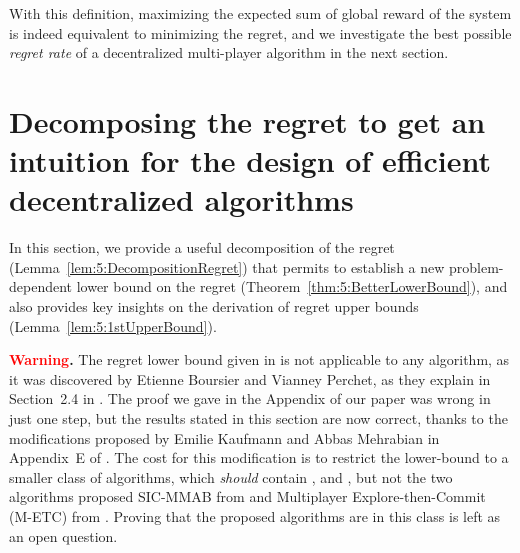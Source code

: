With this definition, maximizing the expected sum of global reward of the system is indeed equivalent to minimizing the regret, and we investigate the best possible \emph{regret rate} of a decentralized multi-player algorithm in the next section.



\section[Decomposing the regret to get an intuition about efficient decentralized algorithms]{Decomposing the regret to get an intuition for the design of efficient decentralized algorithms}
\label{sec:5:lowerbound}

In this section, we provide a useful decomposition of the regret (Lemma~\ref{lem:5:DecompositionRegret}) that permits to establish a new problem-dependent lower bound on the regret (Theorem~\ref{thm:5:BetterLowerBound}), and also provides key insights on the derivation of regret upper bounds (Lemma~\ref{lem:5:1stUpperBound}).

  \textbf{\textcolor{red}{Warning}.}
  The regret lower bound given in \cite{Besson2018ALT} is not applicable to any algorithm,
  as it was discovered by Etienne Boursier and Vianney Perchet, as they explain in Section~2.4 in \cite{BoursierPerchet18}.
  The proof we gave in the Appendix of our paper \cite{Besson2018ALT} was wrong in just one step,
  but the results stated in this section are now correct,
  thanks to the modifications proposed by Emilie Kaufmann and Abbas Mehrabian in Appendix~E of \cite{KaufmannAbbas19}.
  The cost for this modification is to restrict the lower-bound to a smaller class of algorithms, which \emph{should} contain \RhoRand, \RandTopM{} and \MCTopM, but not the two algorithms proposed SIC-MMAB from \cite{BoursierPerchet18} and Multiplayer Explore-then-Commit (M-ETC) from \cite{KaufmannAbbas19}.
  Proving that the proposed algorithms are in this class is left as an open question.


